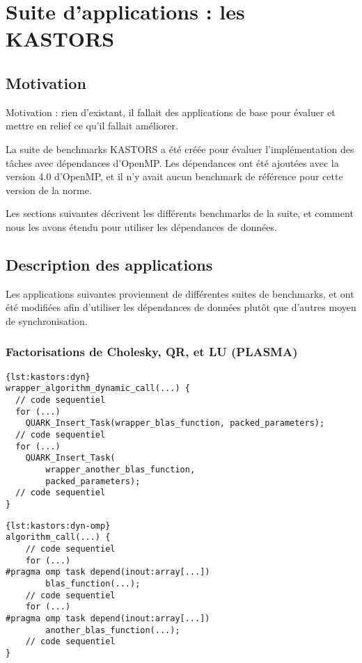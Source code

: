 \section{Suite d'applications : les KASTORS}

\subsection{Motivation}

Motivation : rien d'existant, il fallait des applications de base pour évaluer et mettre en relief ce qu'il fallait améliorer.

La suite de benchmarks KASTORS a été créée pour évaluer l'implémentation des tâches avec dépendances d'OpenMP.
Les dépendances ont été ajoutées avec la version 4.0 d'OpenMP, et il n'y avait aucun benchmark de référence pour cette version de la norme.

Les sections suivantes décrivent les différents benchmarks de la suite, et comment nous les avons étendu pour utiliser les dépendances de données.

\subsection{Description des applications}

Les applications suivantes proviennent de différentes suites de benchmarks, et ont été modifiées afin d'utiliser les dépendances de données plutôt que d'autres moyen de synchronisation.

\subsubsection{Factorisations de Cholesky, QR, et LU (PLASMA)}

\begin{lstlisting}[caption=Format de l'algorithme dynamique,frame=tlrb,label=lst:kastors:dyn]{lst:kastors:dyn}
wrapper_algorithm_dynamic_call(...) {
  // code sequentiel
  for (...)
    QUARK_Insert_Task(wrapper_blas_function, packed_parameters);
  // code sequentiel
  for (...)
    QUARK_Insert_Task(
        wrapper_another_blas_function,
        packed_parameters);
  // code sequentiel
}
\end{lstlisting}
\begin{lstlisting}[caption=Format de l'algorithme OpenMP,frame=tlrb,label=lst:kastors:dyn-omp]{lst:kastors:dyn-omp}
algorithm_call(...) {
    // code sequentiel
    for (...)
#pragma omp task depend(inout:array[...])
        blas_function(...);
    // code sequentiel
    for (...)
#pragma omp task depend(inout:array[...])
        another_blas_function(...);
    // code sequentiel
}
\end{lstlisting}

